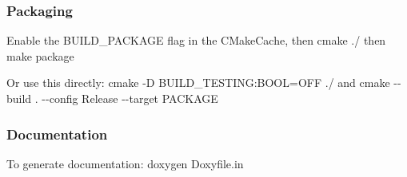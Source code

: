 \subsubsection*{Packaging}


\begin{DoxyItemize}
\item Enable the {\ttfamily B\+U\+I\+L\+D\+\_\+\+P\+A\+C\+K\+A\+GE} flag in the C\+Make\+Cache, then {\ttfamily cmake ./} then {\ttfamily make package}
\item Or use this directly\+: {\ttfamily cmake -\/D B\+U\+I\+L\+D\+\_\+\+T\+E\+S\+T\+I\+NG\+:B\+O\+OL=O\+FF ./} and {\ttfamily cmake -\/-\/build . -\/-\/config Release -\/-\/target P\+A\+C\+K\+A\+GE}
\end{DoxyItemize}

\subsubsection*{Documentation}


\begin{DoxyItemize}
\item To generate documentation\+: {\ttfamily doxygen Doxyfile.\+in} 
\end{DoxyItemize}